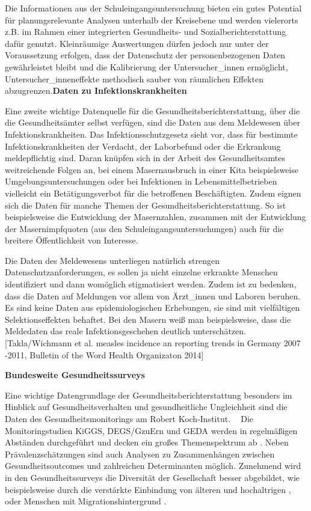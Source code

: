 \documentclass{article}
\begin{document}
Die Informationen aus der Schuleingangsuntersuchung bieten ein gutes Potential für planungsrelevante Analysen unterhalb der Kreisebene und werden vielerorts z.B. im Rahmen einer integrierten Gesundheits- und Sozialberichterstattung dafür genutzt. Kleinräumige Auswertungen dürfen jedoch nur unter der Voraussetzung erfolgen, dass der Datenschutz der personenbezogenen Daten gewährleistet bleibt und die Kalibrierung der Untersucher\_innen ermöglicht, Untersucher\_inneneffekte methodisch sauber von räumlichen Effekten abzugrenzen.\textbf{Daten zu Infektionskrankheiten}


Eine zweite wichtige Datenquelle für die Gesundheitsberichterstattung, über die die Gesundheitsämter selbst verfügen, sind die Daten aus dem Meldewesen über Infektionskrankheiten. Das Infektionsschutzgesetz sieht vor, dass für bestimmte Infektionskrankheiten der Verdacht, der Laborbefund oder die Erkrankung meldepflichtig sind. Daran knüpfen sich in der Arbeit des Gesundheitsamtes weitreichende Folgen an, bei einem Masernausbruch in einer Kita beispielsweise Umgebungsuntersuchungen oder bei Infektionen in Lebensmittelbetrieben vielleicht ein Betätigungsverbot für die betroffenen Beschäftigten. Zudem eignen sich die Daten für manche Themen der Gesundheitsberichterstattung. So ist beispielsweise die Entwicklung der Masernzahlen, zusammen mit der Entwicklung der Masernimpfquoten (aus den Schuleingangsuntersuchungen) auch für die breitere Öffentlichkeit von Interesse.


Die Daten des Meldewesens unterliegen natürlich strengen Datenschutzanforderungen, es sollen ja nicht einzelne erkrankte Menschen identifiziert und dann womöglich stigmatisiert werden. Zudem ist zu bedenken, dass die Daten auf Meldungen vor allem von Ärzt\_innen und Laboren beruhen. Es sind keine Daten aus epidemiologischen Erhebungen, sie sind mit vielfältigen Selektionseffekten behaftet. Bei den Masern weiß man beispielsweise, dass die Meldedaten das reale Infektionsgeschehen deutlich unterschätzen. [Takla/Wichmann et al. measles incidence an reporting trends in Germany 2007 -2011, Bulletin of the Word Health Organizaton 2014]


\textbf{Bundesweite Gesundheitssurveys}


Eine wichtige Datengrundlage der Gesundheitsberichterstattung  besonders im Hinblick auf Gesundheitsverhalten und gesundheitliche Ungleichheit sind die Daten des Gesundheitsmonitorings am Robert Koch-Institut.  Die Monitoringstudien KiGGS, DEGS/GzuErn und GEDA werden in regelmäßigen Abständen durchgeführt und decken ein großes Themenspektrum ab \autocite{KurthBärbel-Mariaundweitere2009}. Neben Prävalenzschätzungen sind auch Analysen zu Zusammenhängen zwischen Gesundheitsoutcomes und zahlreichen Determinanten möglich. Zunehmend wird in den Gesundheitssurveys die Diversität der Gesellschaft besser abgebildet, wie beispielsweise durch die verstärkte Einbindung von älteren und hochaltrigen \autocite{RobertKoch-Institut2020}, oder Menschen mit Migrationshintergrund \autocite{RobertKoch-Institut2020X}.
\end{document}
